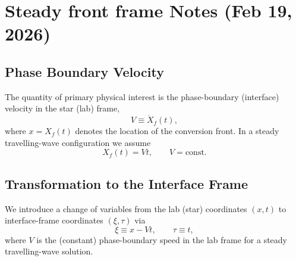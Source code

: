 \documentclass[11pt]{article}
\begin{document}
\newpage
\section{Steady front frame Notes (Feb 19, 2026)}

\subsection{Phase Boundary Velocity}

The quantity of primary physical interest is the phase-boundary (interface) 
velocity in the star (lab) frame,
\begin{equation}
V \equiv \dot X_f(t),
\end{equation}
where $x = X_f(t)$ denotes the location of the conversion front.
In a steady travelling-wave configuration we assume
\begin{equation}
X_f(t) = V t, \qquad V = \text{const}.
\end{equation}

\subsection{Transformation to the Interface Frame}

We introduce a change of variables from the lab (star) coordinates $(x,t)$ to
interface-frame coordinates $(\xi,\tau)$ via
\begin{equation}
\xi \equiv x - V t, \qquad \tau \equiv t,
\end{equation}
where $V$ is the (constant) phase-boundary speed in the lab frame for a steady
travelling-wave solution.
\end{document}
